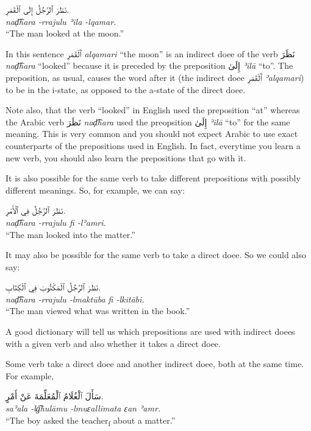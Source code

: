 \documentclass[
  10pt,
]{book}
\begin{document}
\foreignlanguage{arabic}{نَظَرَ ٱلرَّجُلُ إِلَى ٱلْقَمَرِ.}\\
\emph{naḍ͡hara -rrajulu ʾila -lqamar.}\\
\enquote{The man looked at the moon.}

In this sentence \foreignlanguage{arabic}{ٱَلْقَمَرِ} \emph{alqamari} \enquote{the moon} is an indirect doee of the verb \foreignlanguage{arabic}{نَظَرَ} \emph{naḍ͡hara} \enquote{looked} because it is preceded by the preposition \foreignlanguage{arabic}{إِلَىٰ} \emph{ʾilā} \enquote{to}. The preposition, as usual, causes the word after it (the indirect doee \foreignlanguage{arabic}{ٱَلْقَمَرِ} \emph{ʾalqamari}) to be in the i-state, as opposed to the a-state of the direct doee.

Note also, that the verb \enquote{looked} in English used the preposition \enquote{at} whereas the Arabic verb \foreignlanguage{arabic}{نَظَرَ} \emph{naḍ͡hara} used the preopsition \foreignlanguage{arabic}{إِلَىٰ} \emph{ʾilā} \enquote{to} for the same meaning. This is very common and you should not expect Arabic to use exact counterparts of the prepositions used in English. In fact, everytime you learn a new verb, you should also learn the prepositions that go with it.

It is also possible for the same verb to take different prepositions with possibly different meanings. So, for example, we can say:

\foreignlanguage{arabic}{نَظَرَ ٱلرَّجُلُ فِي ٱلْأَمْرِ.}\\
\emph{naḍ͡hara -rrajulu fi -lʾamri.}\\
\enquote{The man looked into the matter.}

It may also be possible for the same verb to take a direct doee. So we could also say:

\foreignlanguage{arabic}{نَظَرَ ٱلرَّجُلُ ٱلْمَکْتُوبَ فِي ٱلْکِتَابِ.}\\
\emph{naḍ͡hara -rrajulu -lmaktūba fi -lkitābi.}\\
\enquote{The man viewed what was written in the book.}

A good dictionary will tell us which prepositions are used with indirect doees with a given verb and also whether it takes a direct doee.

Some verb take a direct doee and another indirect doee, both at the same time. For example,

\foreignlanguage{arabic}{سَأَلَ ٱلْغُلَامُ ٱلْمُعَلِّمَةَ عَنْ أَمْرٍ.}\\
\emph{saʾala -lg͡hulāmu -lmuɛallimata ɛan ʾamr.}\\
\enquote{The boy asked the teacher\textsubscript{f} about a matter.}
\end{document}

